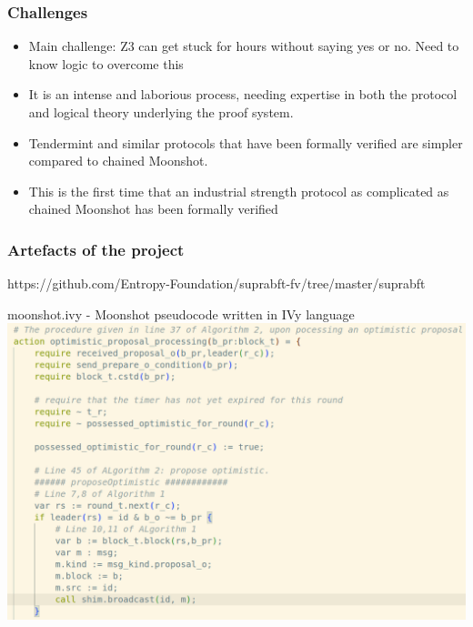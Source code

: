 \documentclass{beamer}
\begin{document}
\begin{frame}
    \frametitle{Challenges}
    \begin{itemize}
        \item Main challenge: Z3 can get stuck for hours without
            saying yes or no. \pause Need to know logic to overcome
            this
            \pause
            \vfill
        \item It is an intense and laborious process, needing expertise in both the protocol and logical theory underlying the proof system.
            \pause
            \vfill
        \item Tendermint and similar protocols that have been formally verified are simpler compared to chained Moonshot.
            \pause
            \vfill
        \item This is the first time that an industrial strength protocol as complicated as chained Moonshot has been formally verified
        \end{itemize}
\end{frame}

\begin{frame}
    \frametitle{Artefacts of the project}
     https://github.com/Entropy-Foundation/suprabft-fv/tree/master/suprabft    

     \alert{moonshot.ivy} - Moonshot pseudocode written in IVy
     language\\
     \includegraphics[scale=0.25]{OptimisticPropProc.png}
\end{frame}
\end{document}
